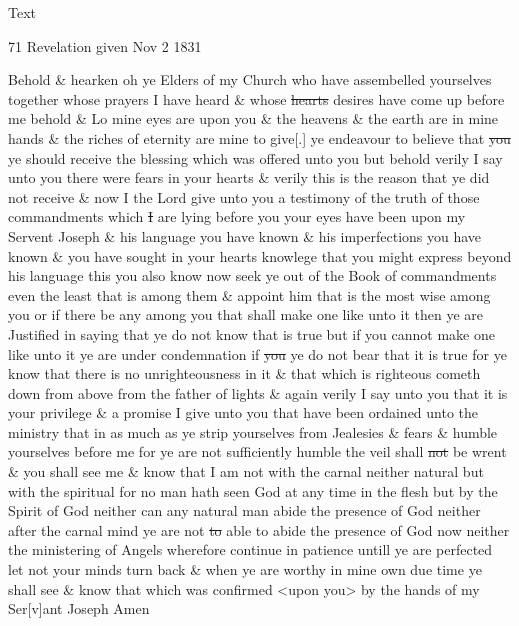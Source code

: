 {			\begin{description}
				\item[Text]
			\end{description}
			
				\begin{tightcenter}
				71 Revelation given Nov 2 1831
				\end{tightcenter}
				
				Behold \& hearken oh ye Elders of my Church who have assembelled yourselves together whose prayers I have heard \& whose \sout{hearts} desires have come up before me behold \& Lo mine eyes are upon you \& the heavens \& the earth are in mine hands \& the riches of eternity are mine to give[.] ye endeavour to believe that \sout{you} ye should receive the blessing which was offered unto you but behold verily I say unto you there were fears in your hearts \& verily this is the reason that ye did not receive \& now I the Lord give unto you a testimony of the truth of those commandments which \sout{I} are lying before you your eyes have been upon my Servent Joseph \& his language you have known \& his imperfections you have known \& you have sought in your hearts knowlege that you might express beyond his language this you also know now seek ye out of the Book of commandments even the least that is among them \& appoint him that is the most wise among you or if there be any among you that shall make one like unto it then ye are Justified in saying that ye do not know that is true but if you cannot make one like unto it ye are under condemnation if \sout{you} ye do not bear that it is true for ye know that there is no unrighteousness in it \& that which is righteous cometh down from above from the father of lights \& again verily I say unto you that it is your privilege \& a promise I give unto you that have been ordained unto the ministry that in as much as ye strip yourselves from Jealesies \& fears \& humble yourselves before me for ye are not sufficiently humble the veil shall \sout{not} be wrent \& you shall see me \& know that I am not with the carnal neither natural but with the spiritual for no man hath seen God at any time in the flesh but by the Spirit of God neither can any natural man abide the presence of God neither after the carnal mind ye are not \sout{to} able to abide the presence of God now neither the ministering of Angels wherefore continue in patience untill ye are perfected let not your minds turn back \& when ye are worthy in mine own due time ye shall see \& know that which was confirmed <upon you> by the hands of my Ser[v]ant Joseph Amen
				
}
